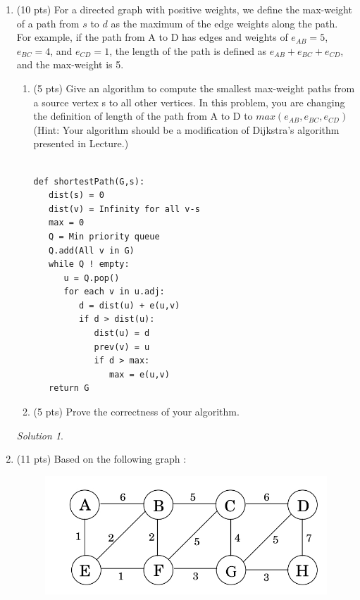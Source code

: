 \documentclass[12pt]{article}
\theoremstyle{remark}
\newtheorem*{solution}{Solution}
\begin{document}
\hrulefill

\newpage
\begin{enumerate}

\item (10 pts) For a directed graph with positive weights, we define the max-weight of a path from $s$ to $d$ as the maximum of the edge weights along the path. For example, if the path from A to D has edges and weights of $e_{AB} = 5$, $e_{BC} = 4$, and $e_{CD}=1$, the length of the path is defined as $e_{AB} + e_{BC} + e_{CD}$, and the max-weight is 5.
\begin{enumerate}
\item(5 pts) Give an algorithm to compute the smallest max-weight paths from a source vertex s to all other vertices. In this problem, you are changing the definition of length of the path from A to D to $max(e_{AB}, e_{BC}, e_{CD})$ (Hint: Your algorithm should be a modification of Dijkstra's algorithm presented in Lecture.)\\ \\

\begin{verbatim}
def shortestPath(G,s): 
   dist(s) = 0 
   dist(v) = Infinity for all v-s
   max = 0
   Q = Min priority queue
   Q.add(All v in G)
   while Q ! empty:
      u = Q.pop()
      for each v in u.adj:
         d = dist(u) + e(u,v)
         if d > dist(u):
            dist(u) = d
            prev(v) = u
            if d > max:
               max = e(u,v)
   return G
\end{verbatim}

\pagebreak
\item(5 pts) Prove the correctness of your algorithm.
\end{enumerate}
\begin{solution}

\end{solution}

\pagebreak

\item (11 pts) Based on the following graph :
\begin{figure}[h!]
\begin{center}
\includegraphics[scale=0.3]{mst_graph_q2.jpg} 
\end{center}
\end{figure}


\end{enumerate}
\end{document}
